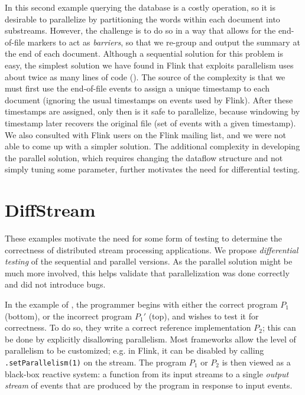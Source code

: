 In this second example querying the database is a costly operation, so
it is desirable to parallelize by partitioning the words within each
document into substreams. However, the challenge is to do so in a way
that allows for the end-of-file markers to act as \emph{barriers}, so
that we re-group and output the summary at the end of each document.
Although a sequential solution for this problem is easy, the simplest
solution we have found in Flink that exploits parallelism uses about
twice as many lines of code
().
The source of the complexity is that we must first use the end-of-file events to assign a unique timestamp to each document (ignoring the usual timestamps on events used by Flink). After these timestamps are assigned, only then is it safe to parallelize, because windowing by timestamp later recovers the original file (set of events with a given timestamp).
We also consulted with Flink users
on the Flink mailing list, and we were not able to come up with a
simpler solution.
The additional complexity in
developing the parallel solution, which requires changing the dataflow
structure and not simply tuning some parameter, further motivates the
need for differential testing.

\section{DiffStream}
\label{diffstream:ssec:overview-solution}

These examples motivate the need for some form of testing to determine
the correctness of distributed stream processing applications. We propose \emph{differential testing} of the sequential and parallel versions. As the parallel solution might be much more involved, this helps validate that parallelization was done correctly and did not introduce bugs.

In the example of , the programmer begins with either the correct program $P_1$ (bottom), or the incorrect program $P_1'$ (top), and wishes to test it for correctness. To do so, they write a correct reference implementation $P_2$; this can be done by explicitly disallowing parallelism. Most frameworks allow the level of parallelism to be customized; e.g. in Flink, it can be disabled by calling \texttt{.setParallelism(1)} on the stream.
The program $P_1$ or $P_2$ is then viewed as a black-box reactive system: a function from its input streams to a single \emph{output stream} of events that are produced by the program in response to input events.

